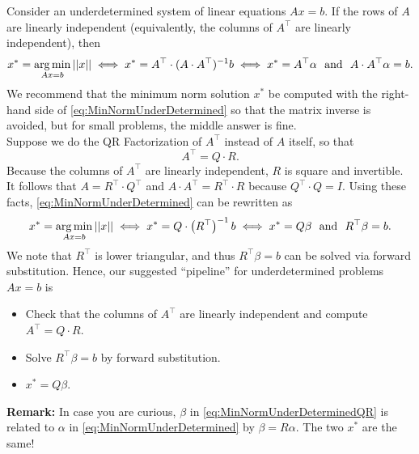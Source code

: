 \begin{tcolorbox}[sharp corners, colback=green!30, colframe=green!80!blue, title=\textbf{\Large Minimum Norm Solution to Underdetermined Equations}]
Consider an underdetermined system of linear equations $Ax=b$. If the rows of $A$ are linearly independent (equivalently, the columns of $A^\top$ are linearly independent), then 
\begin{equation}
\label{eq:MinNormUnderDetermined}
    x^\ast = \operatorname*{arg\,min}_{Ax=b} ||x|| \iff x^\ast = A^\top\cdot (A \cdot A^\top)^{-1} b 
    \iff x^\ast = A^\top \alpha~~\text{and}~~A\cdot A^\top \alpha =b.
\end{equation}
We recommend that the minimum norm solution $x^\ast$ be computed with the right-hand side of \eqref{eq:MinNormUnderDetermined} so that the matrix inverse is avoided, but for small problems, the middle answer is fine. \\

Suppose we do the QR Factorization of $A^\top$ instead of $A$ itself, so that
$$ A^\top = Q \cdot R.$$
Because the columns of $A^\top$ are linearly independent, $R$ is square and invertible. It follows that $A = R^\top \cdot Q^\top$ and $A \cdot A^\top = R^\top \cdot R$ because $Q^\top \cdot Q = I$. Using these facts, \eqref{eq:MinNormUnderDetermined} can be rewritten as
\begin{equation}
\label{eq:MinNormUnderDeterminedQR}
    x^\ast = \operatorname*{arg\,min}_{Ax=b} ||x|| \iff x^\ast = Q \cdot \left( R^\top \right)^{-1} b 
    \iff x^\ast = Q \beta~~\text{and}~~R^\top \beta =b.
\end{equation}
We note that $R^\top$ is lower triangular, and thus $R^\top \beta = b$ can be solved via forward substitution. Hence, our suggested ``pipeline'' for underdetermined problems $Ax=b$ is
\begin{itemize}
    \item Check that the columns of $A^\top$ are linearly independent and compute $A^\top = Q \cdot R.$
    \item Solve $R^\top \beta = b$ by forward substitution.
    \item $x^\ast = Q \beta.$
\end{itemize}

\textbf{Remark:} In case you are curious, $\beta$ in \eqref{eq:MinNormUnderDeterminedQR} is related to $\alpha$ in \eqref{eq:MinNormUnderDetermined} by $\beta = R \alpha. $ The two $x^\ast$ are the same!\\

\end{tcolorbox}


